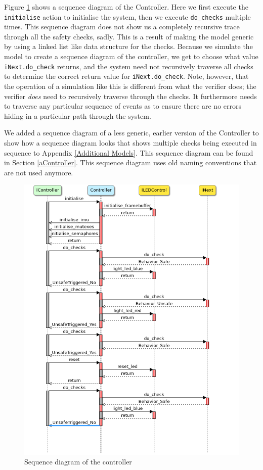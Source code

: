 \documentclass[12pt]{scrreprt}
\begin{document}
Figure \ref{fig:controller_seq} shows a sequence diagram of the Controller. Here we first execute the \texttt{initialise} action to initialise the system, then we execute \texttt{do\_checks} multiple times. This sequence diagram does not show us a completely recursive trace through all the safety checks, sadly. This is a result of making the model generic by using a linked list like data structure for the checks. Because we simulate the model to create a sequence diagram of the controller, we get to choose what value \texttt{iNext.do\_check} returns, and the system need not recursively traverse all checks to determine the correct return value for \texttt{iNext.do\_check}. Note, however, that the operation of a simulation like this is different from what the verifier does; the verifier \textit{does} need to recursively traverse through the checks. It furthermore needs to traverse any particular sequence of events as to ensure there are no errors hiding in a particular path through the system.
\par
We added a sequence diagram of a less generic, earlier version of the Controller to show how a sequence diagram looks that shows multiple checks being executed in sequence to Appendix \ref{Additional Models}. This sequence diagram can be found in Section \ref{aController}. This sequence diagram uses old naming conventions that are not used anymore.


\begin{figure}[H]
    \centering
    \includegraphics[width=\textwidth]{Figures/results/modelling_figures/Controller/Controller_seq.png}
    \caption{Sequence diagram of the controller}
    \label{fig:controller_seq}
\end{figure}
\end{document}
